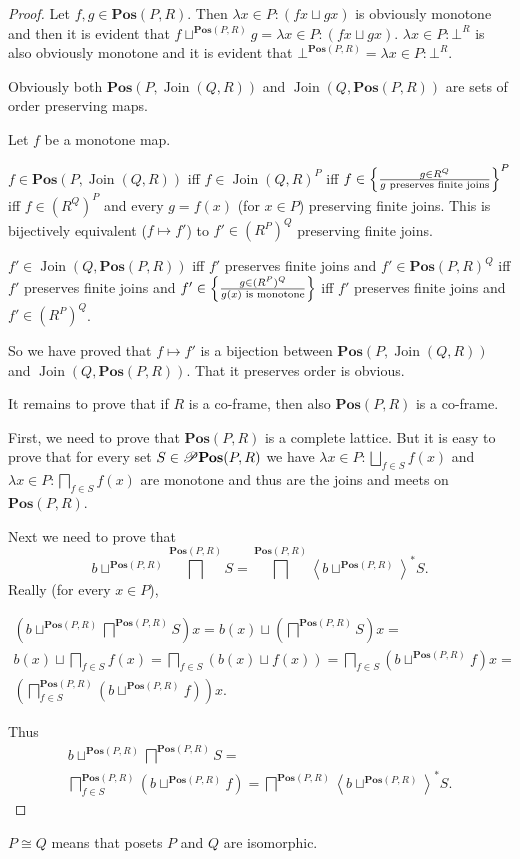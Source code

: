 \begin{proof}
Let $f,g\in\mathbf{Pos}(P,R)$. Then $\lambda x\in P:(fx\sqcup gx)$
is obviously monotone and then it is evident that $f\sqcup^{\mathbf{Pos}(P,R)}g=\lambda x\in P:(fx\sqcup gx)$.
$\lambda x\in P:\bot^{R}$ is also obviously monotone and it is evident
that $\bot^{\mathbf{Pos}(P,R)}=\lambda x\in P:\bot^{R}$.

Obviously both $\mathbf{Pos}(P,\operatorname{Join}(Q,R))$ and $\operatorname{Join}\left(Q,\mathbf{Pos}(P,R)\right)$
are sets of order preserving maps.

Let $f$ be a monotone map.

$f\in\mathbf{Pos}(P,\operatorname{Join}(Q,R))$ iff $f\in\operatorname{Join}(Q,R)^{P}$
iff $f\in\left\{ \frac{ g\in R^{Q} }{ g\text{ preserves finite joins}}\right\} ^{P}$
iff $f\in(R^{Q})^{P}$ and every $g=f(x)$ (for $x\in P$) preserving
finite joins. This is bijectively equivalent ($f\mapsto f'$) to $f'\in(R^{P})^{Q}$
preserving finite joins.

$f'\in\operatorname{Join}\left(Q,\mathbf{Pos}(P,R)\right)$ iff $f'$
preserves finite joins and $f'\in\mathbf{Pos}(P,R)^{Q}$ iff $f'$
preserves finite joins and $f'\in\left\{ \frac{g\in(R^{P})^{Q}}{g(x)\text{ is monotone}}\right\}$
iff $f'$ preserves finite joins and $f'\in(R^{P})^{Q}$.

So we have proved that $f\mapsto f'$ is a bijection between $\mathbf{Pos}(P,\operatorname{Join}(Q,R))$
and $\operatorname{Join}\left(Q,\mathbf{Pos}(P,R)\right)$. That it
preserves order is obvious.

It remains to prove that if $R$ is a co-frame, then also $\mathbf{Pos}(P,R)$
is a co-frame.

First, we need to prove that $\mathbf{Pos}(P,R)$ is a complete lattice.
But it is easy to prove that for every set $S\in\mathscr{P}\mathbf{Pos}(P,R)$
we have $\lambda x\in P:\bigsqcup_{f\in S}f(x)$ and $\lambda x\in P:\bigsqcap_{f\in S}f(x)$
are monotone and thus are the joins and meets on $\mathbf{Pos}(P,R)$.

Next we need to prove that 
\[
b\sqcup^{\mathbf{Pos}(P,R)}\bigsqcap^{\mathbf{Pos}(P,R)}S=\bigsqcap^{\mathbf{Pos}(P,R)}\left\langle b\sqcup^{\mathbf{Pos}(P,R)}\right\rangle ^{\ast}S.
\]
Really (for every $x\in P$),

\begin{multline*}
\left(b\sqcup^{\mathbf{Pos}(P,R)}\bigsqcap^{\mathbf{Pos}(P,R)}S\right)x=b(x)\sqcup\left(\bigsqcap^{\mathbf{Pos}(P,R)}S\right)x=\\
b(x)\sqcup\bigsqcap_{f\in S}f(x)=\bigsqcap_{f\in S}(b(x)\sqcup f(x))=\bigsqcap_{f\in S}\left(b\sqcup^{\mathbf{Pos}(P,R)}f\right)x=\\
\left(\bigsqcap_{f\in S}^{\mathbf{Pos}(P,R)}\left(b\sqcup^{\mathbf{Pos}(P,R)}f\right)\right)x.
\end{multline*}


Thus
\begin{multline*}
b\sqcup^{\mathbf{Pos}(P,R)}\bigsqcap^{\mathbf{Pos}(P,R)}S=\\\bigsqcap_{f\in S}^{\mathbf{Pos}(P,R)}\left(b\sqcup^{\mathbf{Pos}(P,R)}f\right)=\bigsqcap^{\mathbf{Pos}(P,R)}\left\langle b\sqcup^{\mathbf{Pos}(P,R)}\right\rangle ^{\ast}S.
\end{multline*}
\end{proof}
\begin{defn}
$P\cong Q$ means that posets $P$ and $Q$ are isomorphic.\end{defn}
